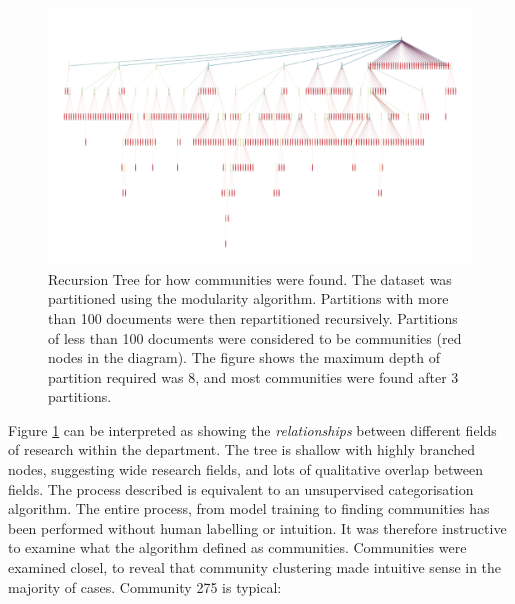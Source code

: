 \begin{center}
\begin{figure}[H]
\label{fig:COMMTREE}
  \centering
    \includegraphics[width=\textwidth]{Analysis/comms.png}
    \caption{Recursion Tree for how communities were found. The dataset was partitioned using the modularity algorithm. Partitions with more than 100 documents were then repartitioned recursively. Partitions of less than 100 documents were considered to be communities (red nodes in the diagram). The figure shows the maximum depth of partition required was 8, and most communities were found after 3 partitions.}
\end{figure} 
\end{center}
Figure \ref{fig:COMMTREE} can be interpreted as showing the \emph{relationships} between different fields of research within the department. The tree is shallow with highly branched nodes, suggesting wide research fields, and lots of qualitative overlap between fields.
The process described is equivalent to an unsupervised categorisation algorithm. The entire process, from model training to finding communities has been performed without human labelling or intuition. It was therefore instructive to examine what the algorithm defined as communities.
Communities were examined closel, to reveal that community clustering made intuitive sense in the majority of cases. Community 275 is typical:
